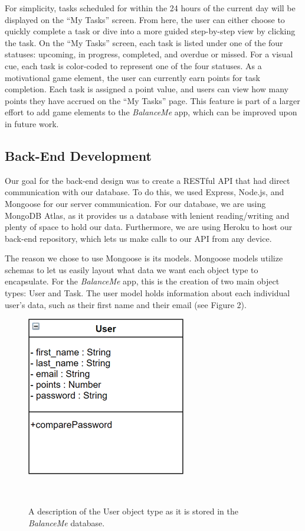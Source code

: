 \documentclass{sigchi}
\begin{document}
For simplicity, tasks scheduled for within the 24 hours of the current day will
be displayed on the ``My Tasks'' screen.  From here, the user can either choose
to quickly complete a task or dive into a more guided step-by-step view by
clicking the task. On the ``My Tasks'' screen, each task is listed under one of
the four statuses: upcoming, in progress, completed, and overdue or missed. For
a visual cue, each task is color-coded to represent one of the four statuses.
As a motivational game element, the user can currently earn points for task
completion. Each task is assigned a point value, and users can view how many
points they have accrued on the ``My Tasks'' page. This feature is part of a
larger effort to add game elements to the \textit{BalanceMe} app, which can be
improved upon in future work.

\subsection{Back-End Development}
Our goal for the back-end design was to create a RESTful API that had direct
communication with our database. To do this, we used Express, Node.js, and
Mongoose for our server communication. For our database, we are using MongoDB
Atlas, as it provides us a database with lenient reading/writing and plenty of
space to hold our data. Furthermore, we are using Heroku to host our back-end
repository, which lets us make calls to our API from any device.

The reason we chose to use Mongoose is its models. Mongoose models utilize
schemas to let us easily layout what data we want each object type to
encapsulate. For the \textit{BalanceMe} app, this is the creation of two main
object types: User and Task. The user model holds information about each
individual user’s data, such as their first name and their email (see Figure 2).

\begin{figure}
\centering
  \includegraphics[width=0.6\columnwidth]{figures/user}
  \caption{A description of the User object type as it is stored in the
	\textit{BalanceMe} database. }~\label{fig:figure2}
\end{figure}
\end{document}
